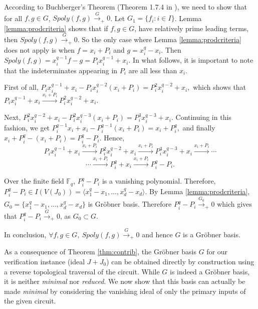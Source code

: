 \begin{Proof}
According to Buchberger's Theorem (Theorem 1.7.4 in \cite{gb_book}),
we need to show that for all $f, g \in G$, $Spoly(f,g)
\stackrel{G}{\rightarrow}_+ 0$. Let $G_1=\{ f_i : i \in I \}$. Lemma
\ref{lemma:prodcriteria} shows that if $f, g \in G$, have relatively
prime leading terms, then  $Spoly(f,g) \stackrel{G}{\rightarrow}_+
0$. So the only case where Lemma \ref{lemma:prodcriteria} does not
apply is when $f = x_i + P_i$ and $g = x_i^q-x_i$. Then $Spoly(f,g)=
x_i^{q-1} f - g = P_i x_i^{q-1} + x_i$. In what follows, it is important
to note that the indeterminates appearing in $P_i$ are all less than
$x_i$.  

First of all,  $P_i x_i^{q-1} +x_i -
P_ix_i^{q-2}(x_i+P_i)=P_i^2x_i^{q-2} +x_i,$ which shows that $P_i 
x_i^{q-1} +x_i \stackrel{x_i+P_i}{\longrightarrow}  P_i ^2x_i^{q-2}
+x_i.$  

Next, $P_i^2 x_i^{q-2} + x_i  - P_i^2x_i^{q-3}(x_i+P_i)=
P_i^3x_i^{q-3}+ x_i.$ Continuing in this fashion, we get $P_i^{q-1}x_i
+x_i -P_i^{q-1}(x_i+P_i) = x_i + P_i^q,$ and finally 
$x_i+P_i^q -(x_i+P_i) = P_i^q-P_i.$ Hence, 
$$P_i x_i^{q-1} +x_i \stackrel{x_i+P_i}{\longrightarrow}  P_i
^2x_i^{q-2} +x_i \stackrel{x_i+P_i}{\longrightarrow} P_i ^3x_i^{q-3}
+x_i \stackrel{x_i+P_i}{\longrightarrow} \cdots$$
$$\cdots \stackrel{x_i+P_i}{\longrightarrow}
P_i^q+x_i\stackrel{x_i+P_i}{\longrightarrow} P_i^q-P_i.$$ 


Over the finite field $\mathbb{F}_{q}$, $P_i^q-P_i$ is a vanishing
polynomial. Therefore, $P_i^q-P_i \in I(V(J_0))= \langle
x_1^q-x_1, \ldots, x_d^q-x_d\rangle$. By Lemma
\ref{lemma:prodcriteria}, $G_0=\{x_1^q-x_1, \ldots, x_d^q-x_d\}$ is
Gr\"obner basis. Therefore %
$P_i^q-P_i \stackrel{G_0}\rightarrow_+ 0$ which gives that $P_i^q-P_i
\stackrel{G}\rightarrow_+ 0$, as $G_0 \subset G$. 

In conclusion, $\forall f, g \in G, ~Spoly(f,g)
\stackrel{G}\rightarrow _+0$ and hence $G$ is a Gr\"obner basis.
\end{Proof}

As a consequence of Theorem \ref{thm:contrib}, the Gr\"obner basis $G$
for our verification instance (ideal $J + J_0$) can be obtained
directly by construction using a reverse topological traversal of the
circuit.  While $G$ is indeed a Gr\"obner basis, it is neither {\it
  minimal} nor {\it reduced}. We now show that this basis can actually
be made {\it minimal} by considering the vanishing ideal of only the
primary inputs of the given circuit. 

